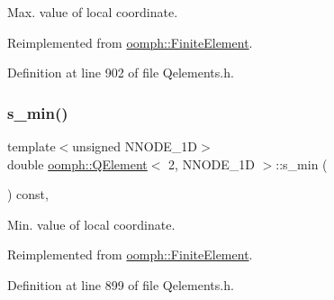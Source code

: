 Max. value of local coordinate. 



Reimplemented from \hyperlink{classoomph_1_1FiniteElement_a64adbe9356927133686ab53f00341ea8}{oomph\+::\+Finite\+Element}.



Definition at line 902 of file Qelements.\+h.

\mbox{\label{classoomph_1_1QElement_3_012_00_01NNODE__1D_01_4_a070d33ed7c9b0b224461b222a8214a99}} 
\subsubsection{\texorpdfstring{s\+\_\+min()}{s\_min()}}
{\footnotesize\ttfamily template$<$unsigned N\+N\+O\+D\+E\+\_\+1D$>$ \\
double \hyperlink{classoomph_1_1QElement}{oomph\+::\+Q\+Element}$<$ 2, N\+N\+O\+D\+E\+\_\+1D $>$\+::s\+\_\+min (\begin{DoxyParamCaption}{ }\end{DoxyParamCaption}) const\hspace{0.3cm}{\ttfamily [inline]}, {\ttfamily [virtual]}}



Min. value of local coordinate. 



Reimplemented from \hyperlink{classoomph_1_1FiniteElement_a35f0803115b68bd162c07de04eeb6c5c}{oomph\+::\+Finite\+Element}.



Definition at line 899 of file Qelements.\+h.

\mbox{\label{classoomph_1_1QElement_3_012_00_01NNODE__1D_01_4_aa5896f828d29204b99aec403027b41a2}} 
